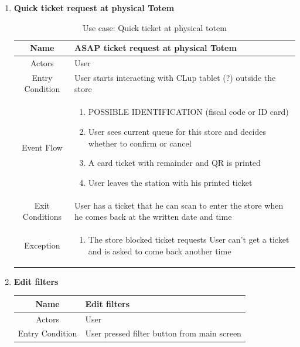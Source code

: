 \begin{enumerate}
\item \textbf{Quick ticket request at physical Totem}

\begin{table}[H]
{
	\begin{tabular}{|c|p{14cm}|}
		\hline
		Name & ASAP ticket request at physical Totem\\
		\hline
		Actors & User\\
		\hline
		Entry Condition & User starts interacting with CLup tablet (?) outside the store\\
		\hline
		
		Event Flow & \begin{enumerate}
			\item POSSIBLE IDENTIFICATION (fiscal code or ID card)
			\item User sees current queue for this store and decides whether to confirm or cancel
			\item A card ticket with remainder and QR is printed
			\item User leaves the station with his printed ticket
			
		\end{enumerate}\\
		
		\hline
		Exit Conditions & User has a ticket that he can scan to enter the store when he comes back at the written date and time\\
		\hline
		
		Exception & \begin{enumerate}
			\item The store blocked ticket requests\newline
			User can’t get a ticket and is asked to come back another time
			
		\end{enumerate}\\
		
		\hline
	\end{tabular}
}
	\label{tab:UCTotem}
	\caption{Use case: Quick ticket at physical totem}
\end{table}

\item \textbf{Edit filters}

\begin{table}[H]
{
	\begin{tabular}{|c|p{14cm}|}
		\hline
		Name & Edit filters\\
		\hline
		Actors & User\\
		\hline
		Entry Condition & User pressed filter button from main screen\\
		\hline
		

\end{tabular}}
\end{table}
\end{enumerate}
